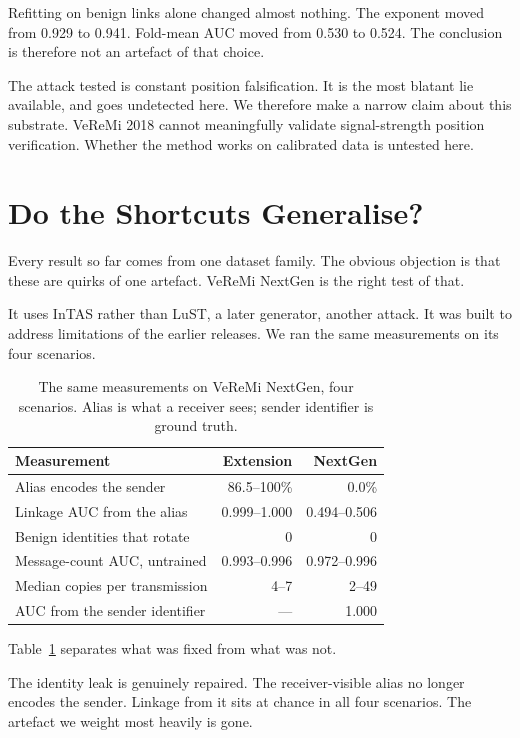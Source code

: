 \documentclass[conference]{IEEEtran}
\begin{document}
Refitting on benign links alone changed almost nothing.
The exponent moved from 0.929 to 0.941.
Fold-mean AUC moved from 0.530 to 0.524.
The conclusion is therefore not an artefact of that choice.

The attack tested is constant position falsification.
It is the most blatant lie available, and goes undetected here.
We therefore make a narrow claim about this substrate.
VeReMi 2018 cannot meaningfully validate signal-strength position verification.
Whether the method works on calibrated data is untested here.

\section{Do the Shortcuts Generalise?}
\label{sec:generalise}

Every result so far comes from one dataset family.
The obvious objection is that these are quirks of one artefact.
VeReMi NextGen is the right test of that.

It uses InTAS rather than LuST, a later generator, another attack.
It was built to address limitations of the earlier releases.
We ran the same measurements on its four scenarios.

\begin{table}[t]
\caption{The same measurements on VeReMi NextGen, four scenarios.
Alias is what a receiver sees; sender identifier is ground truth.}
\label{tab:nextgen}
\centering
\footnotesize
\begin{tabular}{@{}lrr@{}}
\toprule
Measurement & Extension & NextGen \\
\midrule
Alias encodes the sender & 86.5--100\% & 0.0\% \\
Linkage AUC from the alias & 0.999--1.000 & 0.494--0.506 \\
Benign identities that rotate & 0 & 0 \\
Message-count AUC, untrained & 0.993--0.996 & 0.972--0.996 \\
Median copies per transmission & 4--7 & 2--49 \\
AUC from the sender identifier & --- & 1.000 \\
\bottomrule
\end{tabular}
\end{table}

Table~\ref{tab:nextgen} separates what was fixed from what was not.

The identity leak is genuinely repaired.
The receiver-visible alias no longer encodes the sender.
Linkage from it sits at chance in all four scenarios.
The artefact we weight most heavily is gone.
\end{document}

